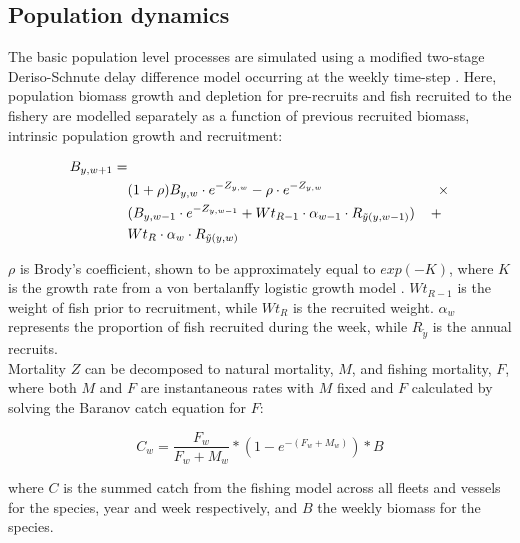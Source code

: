 \documentclass[review]{elsarticle}
\begin{document}
\subsection{Population dynamics}

The basic population level processes are simulated using a modified two-stage
Deriso-Schnute delay difference model \cite{Deriso1980, Schnute1985}
occurring at the weekly time-step \cite{Dichmont2003}. Here, population
biomass growth and depletion for pre-recruits and fish recruited to the fishery
are modelled separately as a function of previous recruited biomass, intrinsic
population growth and recruitment:

\begin{equation*}
	\begin{split}
	B_{y,w+1} = &\\
	& (1 + \rho) B_{y,w} \cdot e^{-Z_{y,w}} - \rho \cdot e^{-Z_{y,w}} \hspace{2.9cm}
	\times \\  
	& (B_{y,w-1} \cdot e^{-Z_{y,w-1}} + Wt_{R-1} \cdot \alpha_{w-1} \cdot R_{\tilde{y}(y,w-1)})
	\hspace{0.4cm} + \\
	& Wt_{R} \cdot \alpha_{w} \cdot R_{\tilde{y}(y,w)} 
	\end{split}
\end{equation*}

$\rho$ is Brody's coefficient, shown to be approximately equal to $exp(-K)$,
where $K$ is the growth rate from a von bertalanffy logistic growth model
\cite{Schnute1985}.  $Wt_{R-1}$ is the weight of fish prior to recruitment,
while $Wt_{R}$ is the recruited weight.  $\alpha_{w}$ represents the proportion of
fish recruited during the week, while $R_{\tilde{y}}$ is the annual
recruits. \\

Mortality $Z$ can be decomposed to natural mortality, $M$, and fishing
mortality, $F$, where both $M$ and $F$ are instantaneous rates with $M$ fixed
and $F$ calculated by solving the Baranov catch equation \cite{Hilborn1992b}
for $F$:

\begin{equation*}
C_{w} = \frac{F_{w}}{F_{w}+M_{w}} * (1 - e^{-(F_{w} + M_{w})}) * B
\end{equation*}

where $C$ is the summed catch from the fishing model across all fleets and
vessels for the species, year and week respectively, and $B$ the weekly biomass
for the species. \\
\end{document}
